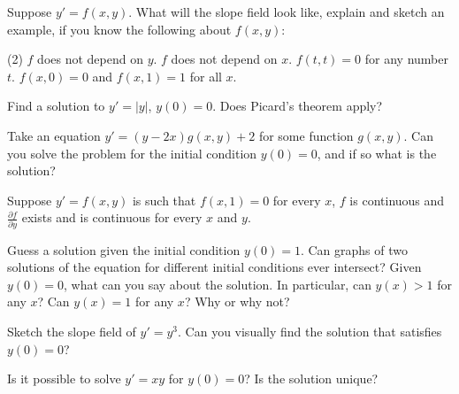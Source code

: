 \begin{exercise}
Suppose $y' = f(x,y)$.  What will the slope field look like, explain and
sketch an example, if you know the following about $f(x,y)$:
\begin{tasks}(2)
\task $f$ does
not depend on $y$.
\task $f$ does not depend on $x$.
\task $f(t,t) = 0$ for any
number $t$.
\task $f(x,0) = 0$ and $f(x,1) = 1$ for all $x$.
\end{tasks}
\end{exercise}

\begin{exercise}
Find a solution to $y' = \lvert y \rvert$, $y(0) = 0$.  Does Picard's theorem apply?
\end{exercise}

\begin{exercise}
Take an equation $y' = (y-2x) g(x,y) + 2$ for some function $g(x,y)$.
Can you solve the problem for the
initial condition $y(0) = 0$,
and if so what is the solution?
\end{exercise}

\begin{exercise}[challenging]
\pagebreak[2]
Suppose $y' = f(x,y)$ is such that $f(x,1) = 0$ for every $x$,
$f$ is continuous and $\frac{\partial f}{\partial y}$ exists and
is continuous for every $x$ and $y$.
\begin{tasks}
\task
Guess a solution given the initial condition
$y(0) = 1$.
\task
Can graphs of two solutions of the equation for different initial conditions
ever intersect?
\task
Given $y(0) = 0$, what can you say about the solution.  In particular,
can $y(x) > 1$ for any $x$?  Can $y(x) = 1$ for any $x$?  Why or why not?
\end{tasks}
\end{exercise}

\setcounter{exercise}{100}

\begin{exercise}
Sketch the slope field of $y'=y^3$.  Can you visually find the solution
that satisfies $y(0)=0$?
\end{exercise}

\begin{exercise}
Is it possible to solve $y' = xy$ for $y(0) = 0$?  Is the solution unique?
\end{exercise}

